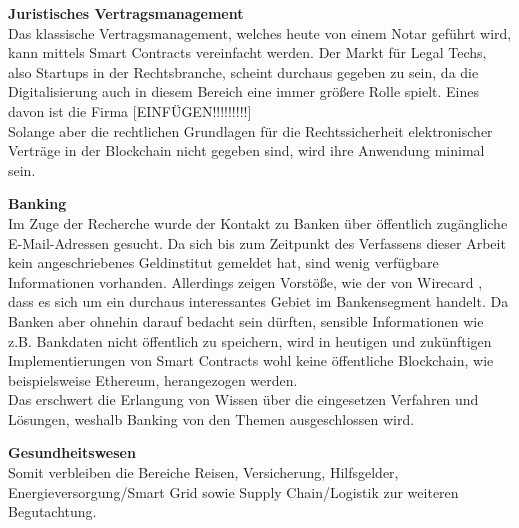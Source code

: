 \textbf{Juristisches Vertragsmanagement}\\
Das klassische Vertragsmanagement, welches heute von einem Notar geführt wird, kann mittels Smart Contracts vereinfacht werden. Der Markt für Legal Techs, also Startups in der Rechtsbranche, scheint durchaus gegeben zu sein, da die Digitalisierung auch in diesem Bereich eine immer größere Rolle spielt. Eines davon ist die Firma [EINFÜGEN!!!!!!!!!]\\
Solange aber die rechtlichen Grundlagen für die Rechtssicherheit elektronischer Verträge in der Blockchain nicht gegeben sind, wird ihre Anwendung minimal sein.


\textbf{Banking}\\
Im Zuge der Recherche wurde der Kontakt zu Banken über öffentlich zugängliche E-Mail-Adressen gesucht. Da sich bis zum Zeitpunkt des Verfassens dieser Arbeit kein angeschriebenes Geldinstitut gemeldet hat, sind wenig verfügbare Informationen vorhanden. Allerdings zeigen Vorstöße, wie der von Wirecard \cite[vgl.][]{Weidemann2018}, dass es sich um ein durchaus interessantes Gebiet im Bankensegment handelt. Da Banken aber ohnehin darauf bedacht sein dürften, sensible Informationen wie z.B. Bankdaten nicht öffentlich zu speichern, wird in heutigen und zukünftigen Implementierungen von Smart Contracts wohl keine öffentliche Blockchain, wie beispielsweise Ethereum, herangezogen werden. \\
Das erschwert die Erlangung von Wissen über die eingesetzen Verfahren und Lösungen, weshalb Banking von den Themen ausgeschlossen wird.

\textbf{Gesundheitswesen}\\

Somit verbleiben die Bereiche Reisen, Versicherung, Hilfsgelder, Energieversorgung/Smart Grid sowie Supply Chain/Logistik zur weiteren Begutachtung.